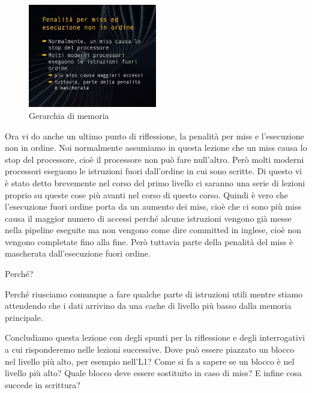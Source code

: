 \FloatBarrier
\begin{figure}[H]
  \centering
  \includegraphics[width=0.50\textwidth,
                    trim=20 20 10 20, %
                    clip]
                    {images/Lez06_p05_fig_06}
  \caption{Gerarchia di memoria}
  \label{fig:Lez06_p05_fig_06}
\end{figure}
\FloatBarrier
\noindent

Ora vi do anche un ultimo punto di riflessione, la penalità per miss e l'esecuzione non in ordine.
Noi normalmente assumiamo in questa lezione che un miss causa lo stop del processore, cioè il processore non può fare null'altro. Però molti moderni processori eseguono le istruzioni fuori dall'ordine in cui sono scritte.
Di questo vi è stato detto brevemente nel corso del primo livello ci saranno una serie di lezioni proprio su queste cose più avanti nel corso di questo corso.
Quindi è vero che l'esecuzione fuori ordine porta da un aumento dei miss, cioè che ci sono più miss causa il maggior numero di accessi perché alcune istruzioni vengono già messe nella pipeline eseguite ma non vengono come dire committed in inglese, cioè non vengono completate fino alla fine. Però tuttavia parte della penalità del miss è mascherata dall'esecuzione fuori ordine.

Perché?

Perché riusciamo comunque a fare qualche parte di istruzioni utili mentre stiamo attendendo che i dati arrivino da una cache di livello più basso dalla memoria principale.


Concludiamo questa lezione con degli spunti per la riflessione e degli interrogativi a cui risponderemo nelle lezioni successive.
Dove può essere piazzato un blocco nel livello più alto, per esempio nell'L1? Come si fa a sapere se un blocco è nel livello più alto? Quale blocco deve essere sostituito in caso di miss? E infine cosa succede in scrittura?